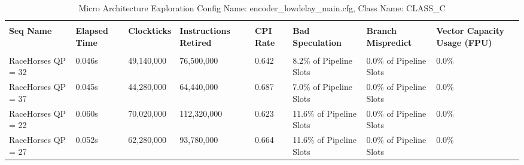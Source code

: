 \documentclass{article}%
\begin{document}
\newpage%
\begin{longtabu}{| X[l] | X[l] | X[l] | X[l] | X[l] | X[l] | X[l] | X[l] |}%
\caption{%
Micro Architecture Exploration\newline%
 Config Name: encoder\_lowdelay\_main.cfg,\newline%
 Class Name: CLASS\_C\newline%
%
}%
\hline%
&&&&&&&\\%
\textbf{Seq Name}&\textbf{Elapsed Time}&\textbf{Clockticks}&\textbf{Instructions Retired}&\textbf{CPI Rate}&\textbf{Bad Speculation}&\textbf{Branch Mispredict}&\textbf{Vector Capacity Usage (FPU)}\\%
&&&&&&&\\%
\hline%
\endhead%
RaceHorses\newline%
 QP = 32&0.046s&49,140,000&76,500,000&0.642&8.2\% of Pipeline Slots&0.0\% of Pipeline Slots&0.0\%\\%
\hline%
RaceHorses\newline%
 QP = 37&0.045s&44,280,000&64,440,000&0.687&7.0\% of Pipeline Slots&0.0\% of Pipeline Slots&0.0\%\\%
\hline%
RaceHorses\newline%
 QP = 22&0.060s&70,020,000&112,320,000&0.623&11.6\% of Pipeline Slots&0.0\% of Pipeline Slots&0.0\%\\%
\hline%
RaceHorses\newline%
 QP = 27&0.052s&62,280,000&93,780,000&0.664&11.6\% of Pipeline Slots&0.0\% of Pipeline Slots&0.0\%\\%
\hline%
\end{longtabu}%
\end{document}
